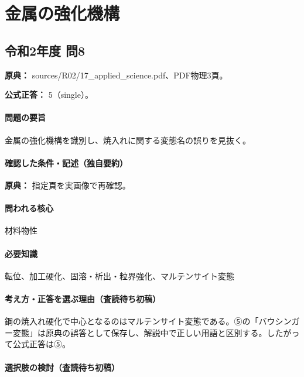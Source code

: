 \section{金属の強化機構}

\subsection{令和2年度 問8}
\label{q:r02-reg-applied-08}

\noindent\textbf{原典：} sources/R02/17\_applied\_science.pdf、PDF物理3頁。

\textbf{公式正答：} 5（single）。

\paragraph{問題の要旨} 金属の強化機構を識別し、焼入れに関する変態名の誤りを見抜く。

\paragraph{確認した条件・記述（独自要約）}\mbox{}\par

\noindent\textbf{原典：} 指定頁を実画像で再確認。\par

\paragraph{問われる核心} 材料物性

\paragraph{必要知識} 転位、加工硬化、固溶・析出・粒界強化、マルテンサイト変態

\paragraph{考え方・正答を選ぶ理由（査読待ち初稿）} 鋼の焼入れ硬化で中心となるのはマルテンサイト変態である。⑤の「バウシンガー変態」は原典の誤答として保存し、解説中で正しい用語と区別する。したがって公式正答は⑤。

\paragraph{選択肢の検討（査読待ち初稿）}\mbox{}\par

